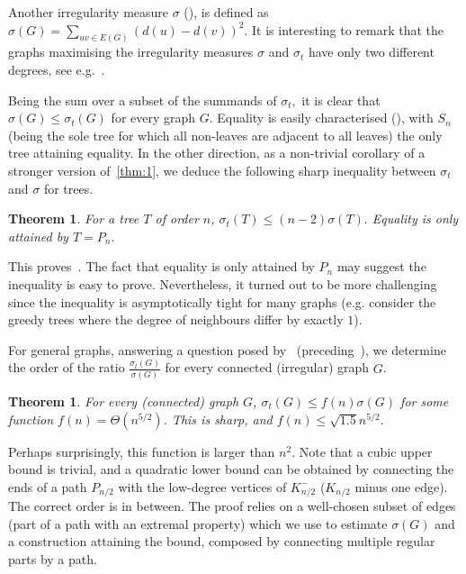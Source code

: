 \documentclass[a4paper,11pt]{article}
\newtheorem{thm}[defi]{Theorem}
\begin{document}
Another irregularity measure $\sigma$ (\cite{FGKZP15,GYCC18}), is defined as
$\sigma(G)=\sum_{uv\in E(G)}(d(u)-d(v))^2.$ 
It is interesting to remark that the graphs maximising the irregularity measures $\sigma$ and $\sigma_t$ have only two different degrees, see e.g.~\cite{ADG18, FDKS24}.

Being the sum over a subset of the summands of $\sigma_t,$ it is clear that $\sigma(G)\le \sigma_t(G)$ for every graph $G$. Equality is easily characterised (\cite[Prop.~23]{FDKS24}), with $S_n$ (being the sole tree for which all non-leaves are adjacent to all leaves) the only tree attaining equality.
In the other direction, as a non-trivial corollary of a stronger version of~\cref{thm:1}, we deduce the following sharp inequality between $\sigma_t$ and $\sigma$ for trees.

\begin{thm}\label{thm:2}
    For a tree $T$ of order $n$, $\sigma_t(T)\le (n-2) \sigma(T).$
    Equality is only attained by $T=P_n.$
\end{thm}

This proves~\cite[Conj.~25]{FDKS24}.
The fact that equality is only attained by $P_n$ may suggest the inequality is easy to prove. Nevertheless, it turned out to be more challenging since the inequality is asymptotically tight for many graphs (e.g. consider the greedy trees where the degree of neighbours differ by exactly $1$).

For general graphs, answering a question posed by~\cite{FDKS24} (preceding~\cite[Conj.~25]{FDKS24}), we determine the order of the ratio $\frac{\sigma_t(G)}{\sigma(G)}$ for every connected (irregular) graph $G$.

\begin{thm}\label{thm:3}
    For every (connected) graph $G$, $\sigma_t(G) \le f(n) \sigma(G)$ for some function $f(n)= \Theta(n^{5/2})$. This is sharp, and $f(n) \le \sqrt{1.5} n^{5/2}.$
\end{thm}

Perhaps surprisingly, this function is larger than $n^2$.
Note that a cubic upper bound is trivial, and a quadratic lower bound can be obtained by connecting the ends of a path $P_{n/2}$ with the low-degree vertices of $K_{n/2}^-$ ($K_{n/2}$ minus one edge). The correct order is in between.
The proof relies on a well-chosen subset of edges (part of a path with an extremal property) which we use to estimate $\sigma(G)$ and a construction attaining the bound, composed by connecting multiple regular parts by a path.
\end{document}
